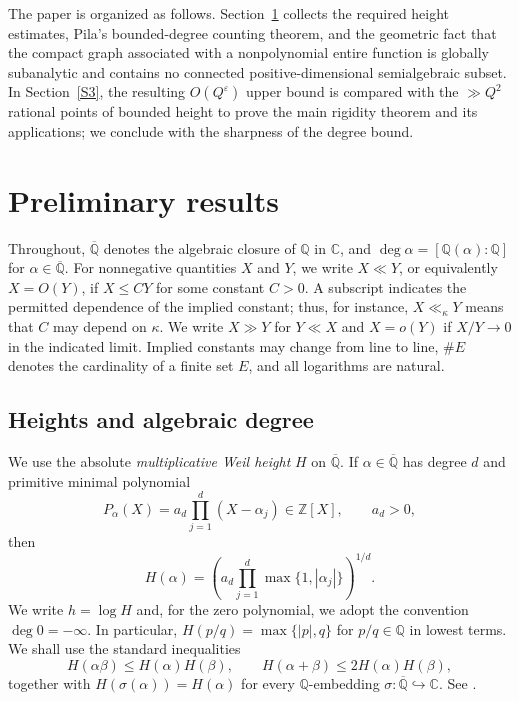 \documentclass[11pt]{amsart}
\theoremstyle{remark}
\newcommand{\Q}{\mathbb{Q}}
\newcommand{\C}{\mathbb{C}}
\newcommand{\Z}{\mathbb{Z}}
\newcommand{\Qbar}{\overline{\mathbb{Q}}}
\begin{document}
The paper is organized as follows. Section~\ref{S2} collects the required height estimates, Pila's bounded-degree counting theorem, and the geometric fact that the compact graph associated with a nonpolynomial entire function is globally subanalytic and contains no connected positive-dimensional semialgebraic subset. In Section~\ref{S3}, the resulting $O(Q^\varepsilon)$ upper bound is compared with the $\gg Q^2$ rational points of bounded height to prove the main rigidity theorem and its applications; we conclude with the sharpness of the degree bound.

\section{Preliminary results}\label{S2}

Throughout, $\Qbar$ denotes the algebraic closure of $\Q$ in $\C$, and
$\deg\alpha=[\Q(\alpha):\Q]$ for $\alpha\in\Qbar$. For nonnegative quantities
$X$ and $Y$, we write $X\ll Y$, or equivalently $X=O(Y)$, if $X\leq CY$
for some constant $C>0$. A subscript indicates the permitted dependence
of the implied constant; thus, for instance, $X\ll_{\kappa}Y$ means that
$C$ may depend on $\kappa$. We write $X\gg Y$ for $Y\ll X$ and
$X=o(Y)$ if $X/Y\to0$ in the indicated limit. Implied constants may change
from line to line, $\#E$ denotes the cardinality of a finite set $E$, and
all logarithms are natural.

\subsection{Heights and algebraic degree}

We use the absolute \textit{multiplicative Weil height} $H$ on $\Qbar$. If
$\alpha\in\Qbar$ has degree $d$ and primitive minimal polynomial
\[
P_\alpha(X)=a_d\prod_{j=1}^{d}(X-\alpha_j)\in\Z[X],
\qquad a_d>0,
\]
then
\[
H(\alpha)=
\left(a_d\prod_{j=1}^{d}\max\{1,|\alpha_j|\}\right)^{1/d}.
\]
We write $h=\log H$ and, for the zero polynomial, we adopt the convention $\deg 0=-\infty$. In particular,
$H(p/q)=\max\{|p|,q\}$ for $p/q\in\Q$ in lowest terms. We shall use the standard inequalities
\begin{equation}\label{eq:height-basic}
H(\alpha\beta)\leq H(\alpha)H(\beta),
\qquad
H(\alpha+\beta)\leq2H(\alpha)H(\beta),
\end{equation}
together with $H(\sigma(\alpha))=H(\alpha)$ for every $\Q$-embedding
$\sigma:\Qbar\hookrightarrow\C$. See \cite[Chapter~1]{BombieriGubler2006}.
\end{document}
